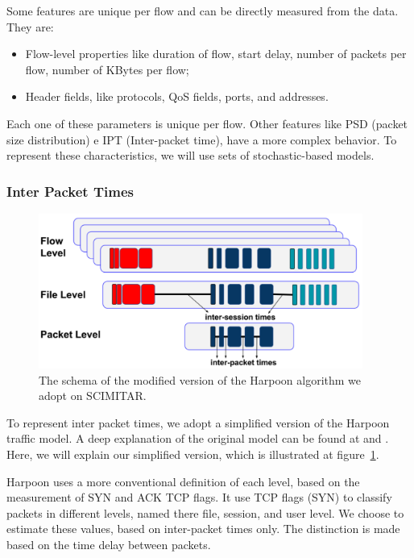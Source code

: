 Some features are unique per flow and can be directly measured from the data. They are:  


\begin{itemize}
\item Flow-level properties like duration of flow, start delay, number of packets per flow, number of KBytes per flow; 
\item Header fields, like protocols, QoS fields, ports, and addresses.
\end{itemize}


Each one of these parameters is unique per flow. Other features like PSD (packet size distribution) e IPT (Inter-packet time), have a more complex behavior.  To represent these characteristics, we will use sets of stochastic-based models.  


\subsubsection{Inter Packet Times}

\begin{figure}[ht!]
    \centering
    \includegraphics[height=2.0in]{figures/ch3/modified-harpoon-model}
    \caption{The schema of the modified version of the Harpoon algorithm we adopt on SCIMITAR.}
    \label{fig:modified-harpoon-model}
\end{figure}

To represent inter packet times, we adopt a simplified version of the Harpoon traffic model. A deep explanation of the original model can be found at \cite{harpoon-paper} and \cite{harpoon-validation}. Here, we will explain our simplified version, which is illustrated at figure~\ref{fig:modified-harpoon-model}. 


Harpoon uses a more conventional definition of each level, based on the measurement of SYN and ACK TCP flags. It use TCP flags (SYN) to classify packets in different levels, named there file, session, and user level. We choose to estimate these values, based on inter-packet times only. The distinction is made based on the time delay between packets.


